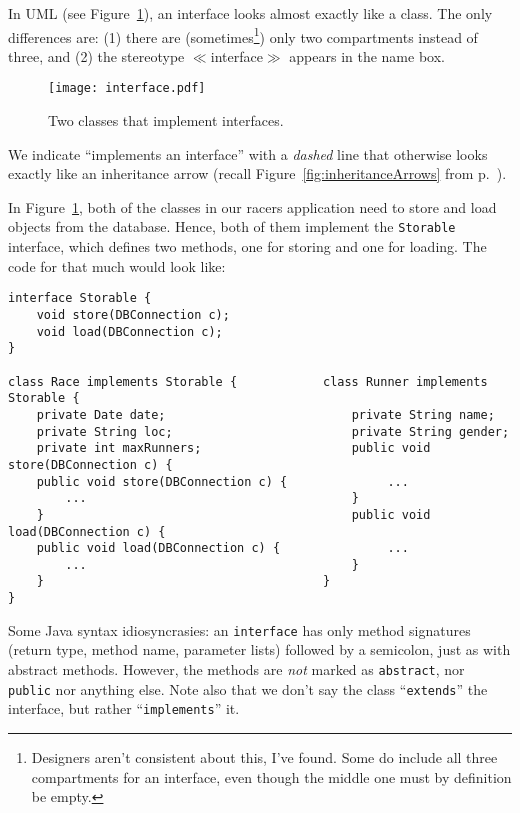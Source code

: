 In UML (see Figure~\ref{fig:interface}), an interface looks almost exactly
like a class. The only differences are: (1) there are
(sometimes\footnote{Designers aren't consistent about this, I've found. Some
do include all three compartments for an interface, even though the middle one
must by definition be empty.}) only two compartments instead of three, and (2)
the stereotype $\ll$interface$\gg$ appears in the name box.

\begin{figure}[ht]
\centering
\texttt{[image: interface.pdf]}
\caption{Two classes that implement interfaces.}
\label{fig:interface}
\end{figure}

We indicate ``implements an interface'' with a \textit{dashed} line that
otherwise looks exactly like an inheritance arrow (recall
Figure~\ref{fig:inheritanceArrows} from p.~\pageref{page:inheritanceArrows}).

In Figure~\ref{fig:interface}, both of the classes in our racers 
application need to store and load objects from the database. Hence, both of
them implement the \texttt{Storable} interface, which defines two methods, one
for storing and one for loading. The code for that much would look like:

\begin{Verbatim}[fontsize=\scriptsize,samepage=true,frame=single]
interface Storable {
    void store(DBConnection c);
    void load(DBConnection c);
}

class Race implements Storable {            class Runner implements Storable {                        
    private Date date;                          private String name;
    private String loc;                         private String gender;
    private int maxRunners;                     public void store(DBConnection c) {
    public void store(DBConnection c) {              ...
        ...                                     }
    }                                           public void load(DBConnection c) {
    public void load(DBConnection c) {               ...
        ...                                     }
    }                                       }                                          
}                                            
\end{Verbatim}

Some Java syntax idiosyncrasies: an \texttt{interface} has only method
signatures (return type, method name, parameter lists) followed by a
semicolon, just as with abstract methods. However, the methods are
\textit{not} marked as \texttt{abstract}, nor \texttt{public} nor anything
else. Note also that we don't say the class ``\texttt{extends}'' the interface,
but rather ``\texttt{implements}'' it.


